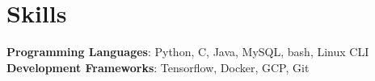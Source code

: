 \section{Skills}
 
\begin{itemize}[leftmargin=0.15in, label={}]
	\small{\item{{}
	
        \textbf{Programming Languages}{: Python, C, Java, MySQL, bash, Linux CLI} \\
		\textbf{Development Frameworks}{: Tensorflow, Docker, GCP, Git}\\
}}
\end{itemize}

